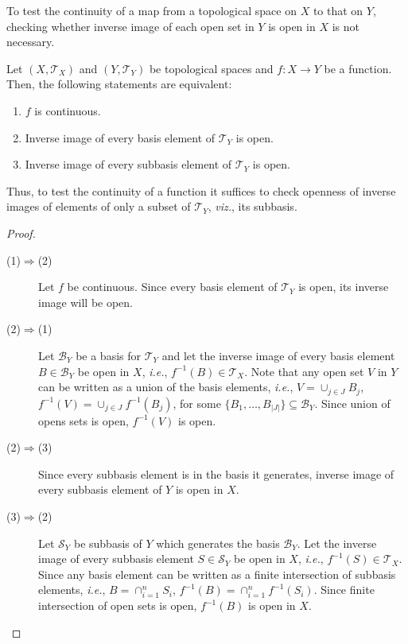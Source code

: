 \documentclass[a4paper,english,12pt]{article}
\begin{document}
To test the continuity of a map from a topological space on $X$ to that on $Y$, checking whether inverse image of each open set in $Y$ is open in $X$ is not necessary.
\begin{thm}
Let $(X,\mathcal{T}_X)$ and $(Y,\mathcal{T}_Y)$ be topological spaces and $f:X\rightarrow Y$ be a function. Then, the following statements are equivalent:
\begin{enumerate}
\item $f$ is continuous.
\item Inverse image of every basis element of $\mathcal{T}_Y$ is open.
\item Inverse image of every subbasis element of $\mathcal{T}_Y$ is open.
\end{enumerate}
Thus, to test the continuity of a function it suffices to check openness of inverse images of elements of only a subset of $\mathcal{T}_Y$, \emph{viz.}, its subbasis.
\label{bas}
\end{thm}
\begin{proof}
\begin{description}
\item[(1)$\Rightarrow$(2)]Let $f$ be continuous. Since every basis element of $\mathcal{T}_Y$ is open, its inverse image will be open.
\item[(2)$\Rightarrow$(1)]Let $\mathcal{B}_Y$ be a basis for $\mathcal{T}_Y$ and let the inverse image of every basis element $B\in \mathcal{B}_Y$ be open in $X$, \emph{i.e.}, $f^{-1}(B)\in \mathcal{T}_X$. Note that any open set $V$ in $Y$ can be written as a union of the basis elements, \emph{i.e.}, $V=\cup _{j\in J}B_j$, $f^{-1}(V)=\cup _{j\in J}f^{-1}(B_j)$, for some $\{B_1,\dots,B_{|J|}\}\subseteq \mathcal{B}_Y$. Since union of opens sets is open, $f^{-1}(V)$ is open.
\item[(2)$\Rightarrow$(3)]Since every subbasis element is in the basis it generates, inverse image of every subbasis element of $Y$ is open in $X$.
\item[(3)$\Rightarrow$(2)]Let $\mathcal{S}_Y$ be subbasis of $Y$ which generates the basis $\mathcal{B}_Y$. Let the inverse image of every subbasis element $S\in \mathcal{S}_Y$ be open in $X$, \emph{i.e.}, $f^{-1}(S)\in \mathcal{T}_X$. Since any basis element can be written as a finite intersection of subbasis elements, \emph{i.e.}, $B=\cap _{i=1}^{n}S_i$, $f^{-1}(B)=\cap _{i=1}^{n}f^{-1}(S_i)$. Since finite intersection of open sets is open, $f^{-1}(B)$ is open in $X$.
\end{description}
\end{proof}
\end{document}
